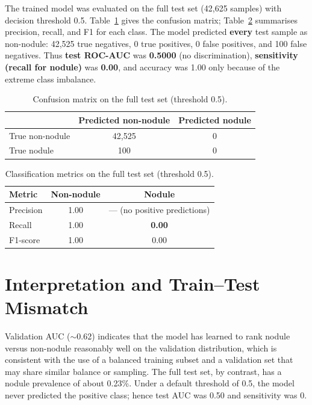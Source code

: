 \documentclass[11pt,a4paper]{article}
\begin{document}
The trained model was evaluated on the full test set (42,625 samples) with decision threshold 0.5. Table~\ref{tab:confusion} gives the confusion matrix; Table~\ref{tab:metrics} summarises precision, recall, and F1 for each class. The model predicted \textbf{every} test sample as non-nodule: 42,525 true negatives, 0 true positives, 0 false positives, and 100 false negatives. Thus \textbf{test ROC-AUC} was \textbf{0.5000} (no discrimination), \textbf{sensitivity (recall for nodule)} was \textbf{0.00}, and accuracy was 1.00 only because of the extreme class imbalance.

\begin{table}[ht]
\centering
\caption{Confusion matrix on the full test set (threshold 0.5).}
\label{tab:confusion}
\begin{tabular}{@{}lcc@{}}
\toprule
& Predicted non-nodule & Predicted nodule \\
\midrule
True non-nodule & 42,525 & 0 \\
True nodule     & 100    & 0 \\
\bottomrule
\end{tabular}
\end{table}

\begin{table}[ht]
\centering
\caption{Classification metrics on the full test set (threshold 0.5).}
\label{tab:metrics}
\begin{tabular}{@{}lcc@{}}
\toprule
Metric    & Non-nodule & Nodule \\
\midrule
Precision & 1.00 & --- (no positive predictions) \\
Recall    & 1.00 & \textbf{0.00} \\
F1-score  & 1.00 & 0.00 \\
\bottomrule
\end{tabular}
\end{table}

\section{Interpretation and Train--Test Mismatch}

Validation AUC ($\sim$0.62) indicates that the model has learned to rank nodule versus non-nodule reasonably well on the validation distribution, which is consistent with the use of a balanced training subset and a validation set that may share similar balance or sampling. The full test set, by contrast, has a nodule prevalence of about 0.23\%. Under a default threshold of 0.5, the model never predicted the positive class; hence test AUC was 0.50 and sensitivity was 0.
\end{document}
